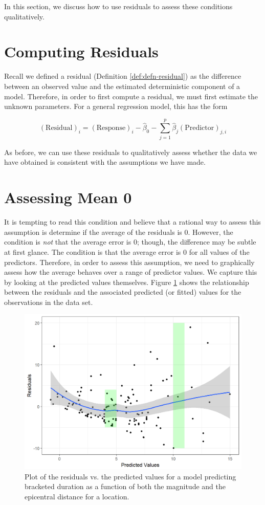 \documentclass[]{book}
\theoremstyle{definition}
\theoremstyle{definition}
\theoremstyle{definition}
\theoremstyle{remark}
\begin{document}
In this section, we discuss how to use residuals to assess these
conditions qualitatively.

\section{Computing Residuals}\label{computing-residuals}

Recall we defined a residual (Definition \ref{def:defn-residual}) as the
difference between an observed value and the estimated deterministic
component of a model. Therefore, in order to first compute a residual,
we must first estimate the unknown parameters. For a general regression
model, this has the form

\[(\text{Residual})_i = (\text{Response})_i - \widehat{\beta}_0 - \sum_{j=1}^{p} \widehat{\beta}_j (\text{Predictor})_{j,i}\]

As before, we can use these residuals to qualitatively assess whether
the data we have obtained is consistent with the assumptions we have
made.

\section{Assessing Mean 0}\label{assessing-mean-0}

It is tempting to read this condition and believe that a rational way to
assess this assumption is determine if the average of the residuals is
0. However, the condition is \emph{not} that the average error is 0;
though, the difference may be subtle at first glance. The condition is
that the average error is 0 for all values of the predictors. Therefore,
in order to assess this assumption, we need to graphically assess how
the average behaves over a range of predictor values. We capture this by
looking at the predicted values themselves. Figure
\ref{fig:regassessment-mean0} shows the relationship between the
residuals and the associated predicted (or fitted) values for the
observations in the data set.

\begin{figure}

{\centering \includegraphics[width=0.8\linewidth]{./Images/regassessment-mean0-1} 

}

\caption{Plot of the residuals vs. the predicted values for a model predicting bracketed duration as a function of both the magnitude and the epicentral distance for a location.}\label{fig:regassessment-mean0}
\end{figure}
\end{document}
